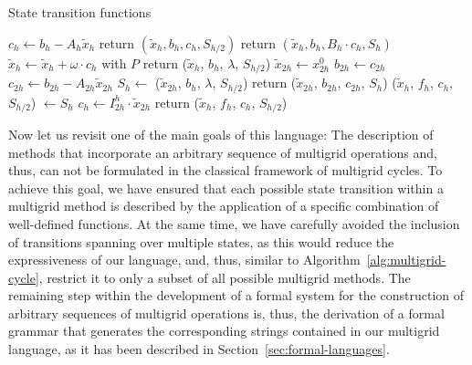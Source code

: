 \begin{table}
	\caption{State transition functions}
	\label{table:grammar-semantics}
	\begin{algorithmic}
	\State $c_h \gets b_h - A_h \tilde{x}_h$
	\State return $(\tilde{x}_h, b_h, c_h, S_{h/2})$
	\EndFunction
	\State
	\State return $(\tilde{x}_h, b_h, B_h\cdot c_h, S_h)$
	\EndFunction
	\State
	\State $\tilde{x}_h \gets \tilde{x}_h + \omega \cdot c_h$ with $P$
	\State return ($\tilde{x}_h$, $b_h$, $\lambda$, $S_{h/2}$) 
	\EndFunction
	\State
	\State $\tilde{x}_{2h} \gets x_{2h}^0$ 
	\State $b_{2h} \gets c_{2h}$
	\State $c_{2h} \gets b_{2h} - A_{2h} \tilde{x}_{2h}$ 
	\State $S_h \gets$ ($\tilde{x}_{2h}$, $b_{h}$, $\lambda$, $S_{h/2}$)
	\State return ($\tilde{x}_{2h}$, $b_{2h}$, $c_{2h}$, $S_h$)
	\EndFunction
	\State
	\State ($\tilde{x}_h$, $f_{h}$, $c_h$, $S_{h/2}$) $\gets S_{h}$
	\State $c_h \gets I_{2h}^{h} \cdot \tilde{x}_{2h}$
	\State return ($\tilde{x}_h$, $f_{h}$, $c_h$, $S_{h/2}$)
	\EndFunction
	\end{algorithmic}
\end{table}
Now let us revisit one of the main goals of this language: The description of methods that incorporate an arbitrary sequence of multigrid operations and, thus, can not be formulated in the classical framework of multigrid cycles.
To achieve this goal, we have ensured that each possible state transition within a multigrid method is described by the application of a specific combination of well-defined functions. 
At the same time, we have carefully avoided the inclusion of transitions spanning over multiple states, as this would reduce the expressiveness of our language, and, thus, similar to Algorithm~\ref{alg:multigrid-cycle}, restrict it to only a subset of all possible multigrid methods.
The remaining step within the development of a formal system for the construction of arbitrary sequences of multigrid operations is, thus, the derivation of a formal grammar that generates the corresponding strings contained in our multigrid language, as it has been described in Section~\ref{sec:formal-languages}.

